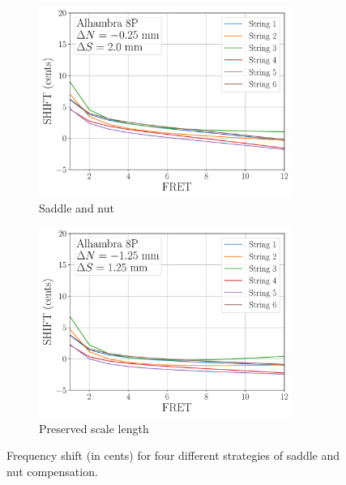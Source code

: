 \begin{figure}
\begin{subfigure}[b]{0.45\textwidth}
   \centering
   \includegraphics[width=3.25in]{figures/shift_compensated_1}
   \caption{Saddle and nut}
   \label{fig:shift_compensated_1}
  \end{subfigure}
  \hspace{0.25in}
  \begin{subfigure}[b]{0.45\textwidth}
   \centering
   \includegraphics[width=3.25in]{figures/shift_compensated_2}
   \caption{Preserved scale length}
   \label{fig:shift_compensated_2}
  \end{subfigure}
  \caption{\label{fig:compensation} Frequency shift (in cents) for four different strategies of saddle and nut compensation.}
 \end{figure}


